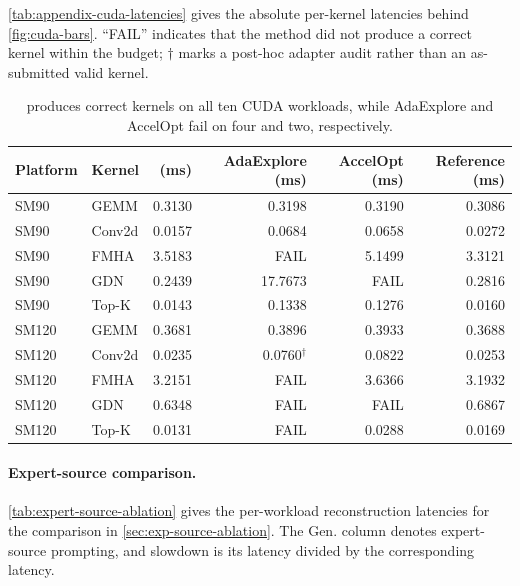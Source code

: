 \autoref{tab:appendix-cuda-latencies} gives the absolute per-kernel latencies behind
\autoref{fig:cuda-bars}. ``FAIL'' indicates that the method did not produce a correct
kernel within the budget; $\dagger$ marks a post-hoc adapter audit rather than an
as-submitted valid kernel.

\begin{table}[h]
  \centering
  \small
  \setlength{\tabcolsep}{6pt}
  \begin{tabular}{@{}llrrrr@{}}
    \toprule
    \textbf{Platform} & \textbf{Kernel} & \textbf{\sys{} (ms)} & \textbf{AdaExplore (ms)} & \textbf{AccelOpt (ms)} & \textbf{Reference (ms)} \\
    \midrule
    SM90  & GEMM   & 0.3130  & 0.3198   & 0.3190  & 0.3086 \\
    SM90  & Conv2d & 0.0157  & 0.0684   & 0.0658  & 0.0272 \\
    SM90  & FMHA   & 3.5183  & FAIL     & 5.1499  & 3.3121 \\
    SM90  & GDN    & 0.2439  & 17.7673  & FAIL    & 0.2816 \\
    SM90  & Top-K  & 0.0143  & 0.1338   & 0.1276  & 0.0160 \\
    \midrule
    SM120 & GEMM   & 0.3681  & 0.3896   & 0.3933  & 0.3688 \\
    SM120 & Conv2d & 0.0235  & 0.0760$^\dagger$ & 0.0822  & 0.0253 \\
    SM120 & FMHA   & 3.2151  & FAIL     & 3.6366  & 3.1932 \\
    SM120 & GDN    & 0.6348  & FAIL     & FAIL    & 0.6867 \\
    SM120 & Top-K  & 0.0131  & FAIL     & 0.0288  & 0.0169 \\
    \bottomrule
  \end{tabular}
  \caption{\sys{} produces correct kernels on all ten CUDA workloads, while AdaExplore and AccelOpt fail on four and two, respectively.}
  \label{tab:appendix-cuda-latencies}
\end{table}

\paragraph{Expert-source comparison.}
\autoref{tab:expert-source-ablation} gives the per-workload reconstruction latencies for the comparison in \autoref{sec:exp-source-ablation}. The Gen. column denotes expert-source prompting, and slowdown is its latency divided by the corresponding \sys{} latency.

